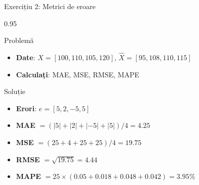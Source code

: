 \documentclass[9pt, aspectratio=169, t]{beamer}
\begin{document}
\begin{frame}{Exercițiu 2: Metrici de eroare}
    \begin{cminipage}{0.95\textwidth}
    \begin{alertblock}{Problemă}
        \begin{itemize}\setlength{\itemsep}{0pt}
            \item \textbf{Date}: $X = [100, 110, 105, 120]$, $\hat{X} = [95, 108, 110, 115]$
            \item \textbf{Calculați}: MAE, MSE, RMSE, MAPE
        \end{itemize}
    \end{alertblock}

    \vspace{0.2cm}
    \begin{exampleblock}{Soluție}
        \begin{itemize}\setlength{\itemsep}{0pt}
            \item \textbf{Erori}: $e = [5, 2, -5, 5]$
            \item \textbf{MAE} $= (|5|+|2|+|-5|+|5|)/4 = 4.25$
            \item \textbf{MSE} $= (25+4+25+25)/4 = 19.75$
            \item \textbf{RMSE} $= \sqrt{19.75} = 4.44$
            \item \textbf{MAPE} $= 25 \times (0.05+0.018+0.048+0.042) = 3.95\%$
        \end{itemize}
    \end{exampleblock}
    \end{cminipage}
\end{frame}
\end{document}
